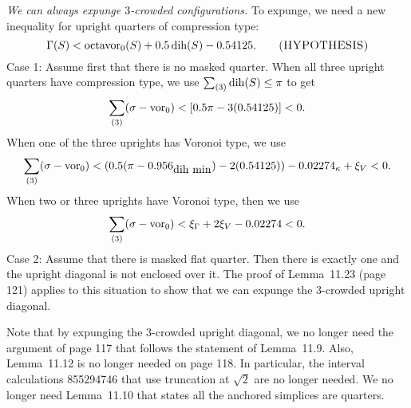 \documentclass[11pt]{amsart}
\def\op#1{{\text{#1}}}
\def\text{\hbox}
\begin{document}
{\it We can always expunge $3$-crowded configurations.}  
To expunge,
we need a new inequality for upright quarters of compression type:
   $$
   \Gamma(S) < \op{octavor}_0(S) + 0.5\,\op{dih}(S) - 0.54125.
   \qquad \text{\sc(HYPOTHESIS)}
   $$
Case 1: Assume first that there is no masked quarter.
When all three upright quarters have compression type, we use
$\sum_{(3)} \op{dih}(S) \le \pi$ to get
   $$\sum_{(3)}(\sigma-\op{vor}_0) < 
      [0.5\pi - 3 (0.54125)] < 0.$$
When one of the three uprights has Voronoi type, we use
  $$\sum_{(3)}(\sigma - \op{vor}_0 ) <
    (0.5(\pi - 0.956_{\text{dih min}}) - 2(0.54125)) 
    - 0.02274_{\kappa}
    + \xi_V < 0.$$
When two or three uprights have Voronoi type, then we use
   $$\sum_{(3)}(\sigma - \op{vor}_0 ) <
   \xi_\Gamma + 2\xi_V -0.02274 < 0.$$
Case 2: Assume that there is masked flat quarter.  Then there
is exactly one and the upright diagonal is not enclosed over it.
The proof of Lemma~11.23 (page 121) applies to this situation
to show that we can expunge the $3$-crowded upright diagonal.

Note that by expunging the $3$-crowded upright diagonal, we
no longer need the argument of page 117 that follows the statement of Lemma~11.9.  Also, Lemma~11.12 is no longer needed on page 118.
In particular, the interval calculations 855294746 that use truncation at $\sqrt2$ are no longer needed.  We no longer
need Lemma~11.10 that states all the anchored simplices are
quarters.
\end{document}

